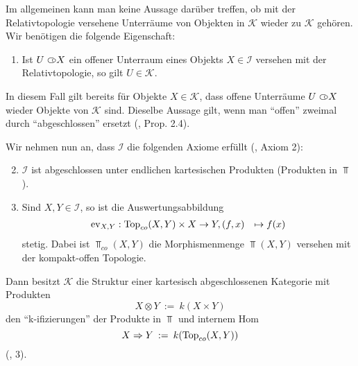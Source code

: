 Im allgemeinen kann man keine Aussage darüber treffen, ob mit der
Relativtopologie versehene Unterräume von Objekten in $\mathcal{K}$
wieder zu $\mathcal{K}$ gehören. Wir benötigen die folgende
Eigenschaft:
\begin{enumerate}
\item \label{itm:k-axiom-subspace} Ist $U \subset\kern-0.58em\circ X$ ein offener
  Unterraum eines Objekts $X \in \mathcal{I}$ versehen mit der
  Relativtopologie, so gilt $U \in \mathcal{K}$.
\end{enumerate}
In diesem Fall gilt bereits für Objekte $X \in \mathcal{K}$, dass
offene Unterräume $U \subset\kern-0.58em\circ X$ wieder Objekte von $\mathcal{K}$
sind. Dieselbe Aussage gilt, wenn man ``offen'' zweimal durch
``abgeschlossen'' ersetzt (\cite{Vogt}, Prop. 2.4).

Wir nehmen nun an, dass $\mathcal{I}$ die folgenden Axiome erfüllt
(\cite{Vogt}, Axiom 2):
\begin{enumerate}
  \setcounter{enumi}{1}
  \item \label{itm:k-axiom-prod} $\mathcal{I}$ ist abgeschlossen unter
    endlichen kartesischen Produkten (Produkten in $\Top$).
  \item \label{itm:k-axiom-ev} Sind $X, Y \in \mathcal{I}$, so ist die
    Auswertungsabbildung
    \begin{align*}
      \operatorname{ev}_{X, Y}: \operatorname{Top}_{co}(X, Y) \times X &\to Y,
      (f, x) &\mapsto f(x)
    \end{align*}
    stetig. Dabei ist $\Top_{co}(X, Y)$ die Morphismenmenge $\Top(X,
    Y)$ versehen mit der kompakt-offen Topologie.
\end{enumerate}
Dann besitzt $\mathcal{K}$ die Struktur einer kartesisch
abgeschlossenen Kategorie mit Produkten
\[ X \otimes Y \: := \: k(X \times Y) \]
den ``k-ifizierungen'' der Produkte in $\Top$ und internem Hom
\[ X \Rightarrow Y \: := \: k(\operatorname{Top}_{co}(X, Y)) \] 
(\cite{Vogt}, 3).

